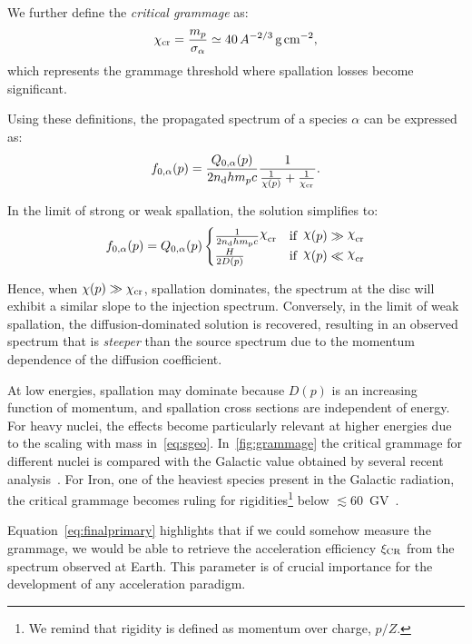 We further define the \emph{critical grammage} as:  
\begin{equation}
\chi_{\rm cr} = \frac{m_p}{\sigma_\alpha} \simeq 40 \, A^{-2/3} \, \text{g} \, \text{cm}^{-2},
\end{equation}
which represents the grammage threshold where spallation losses become significant.  

Using these definitions, the propagated spectrum of a species \(\alpha\) can be expressed as:  
\begin{equation}\label{eq:finalprimary}
f_{0,\alpha}(p) = \frac{Q_{0,\alpha}(p)}{2 n_{\rm d} h m_p c} \frac{1}{\frac{1}{\chi(p)} + \frac{1}{\chi_{\rm cr}}}.
\end{equation}

In the limit of strong or weak spallation, the solution simplifies to:  
\begin{equation}
f_{0,\alpha}(p) = Q_{0,\alpha}(p)
\begin{cases}
\frac{1}{2n_{\rm d}hm_{\rm p}c}\rchi_{\rm cr} & \text{if } \, \rchi(p) \gg \rchi_{\rm cr} \\
\frac{H}{2D(p)} & \text{if } \, \rchi(p) \ll \rchi_{\rm cr}
\end{cases}
\end{equation}

Hence, when $\chi(p)\gg \chi_{\rm cr}$, spallation dominates, the spectrum at the disc will exhibit a similar slope to the injection spectrum. Conversely, in the limit of weak spallation, the diffusion-dominated solution is recovered, resulting in an observed spectrum that is \emph{steeper} than the source spectrum due to the momentum dependence of the diffusion coefficient.

At low energies, spallation may dominate because $D(p)$ is an increasing function of momentum, and spallation cross sections are independent of energy. For heavy nuclei, the effects become particularly relevant at higher energies due to the scaling with mass in~\cref{eq:sgeo}.
%
In~\cref{fig:grammage} the critical grammage for different nuclei is compared with the Galactic value obtained by several recent analysis~\cite{Evoli2019prd,Weinrich2020aa}. For Iron, one of the heaviest species present in the Galactic radiation, the critical grammage becomes ruling for rigidities\footnote{We remind that rigidity is defined as momentum over charge, $p/Z$.} below $\lesssim 60$~GV~\cite{Schroer2021prd}.

Equation~\eqref{eq:finalprimary} highlights that if we could somehow measure the grammage, we would be able to retrieve the acceleration efficiency $\xi_{\rm CR}$ from the spectrum observed at Earth. This parameter is of crucial importance for the development of any acceleration paradigm.

